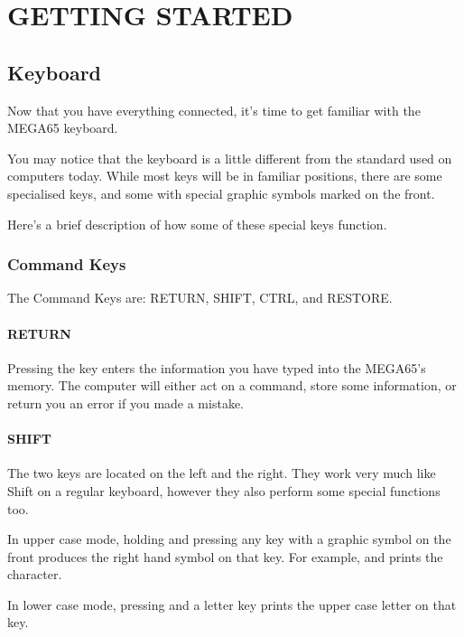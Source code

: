 \chapter{GETTING STARTED}
\section{Keyboard}

Now that you have everything connected, it's time to get familiar with the MEGA65 keyboard.

You may notice that the keyboard is a little different from the standard used on computers today. While most keys will be in familiar positions, there are some specialised keys, and some with special graphic symbols marked on the front.

Here's a brief description of how some of these special keys function.

\subsection{Command Keys}

The Command Keys are: RETURN, SHIFT, CTRL, \megakeysymbol and RESTORE.

\subsubsection{RETURN}

Pressing the  key enters the information you have typed into the MEGA65's memory. The computer will either act on a command, store some information, or return you an error if you made a mistake.

\subsubsection{SHIFT}

The two  keys are located on the left and the right. They work very much like Shift on a regular keyboard, however they also perform some special functions too.

In upper case mode, holding  and pressing any key with a graphic symbol on the front produces the right hand symbol on that key. For example,  and  prints the character.

In lower case mode, pressing  and a letter key prints the upper case letter on that key.

